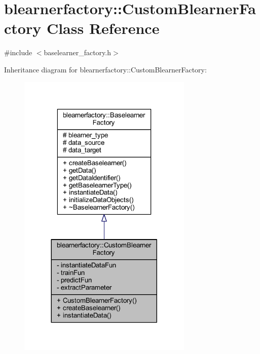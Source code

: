 \hypertarget{classblearnerfactory_1_1_custom_blearner_factory}{}\section{blearnerfactory\+:\+:Custom\+Blearner\+Factory Class Reference}
\label{classblearnerfactory_1_1_custom_blearner_factory}


{\ttfamily \#include $<$baselearner\+\_\+factory.\+h$>$}



Inheritance diagram for blearnerfactory\+:\+:Custom\+Blearner\+Factory\+:\nopagebreak
\begin{figure}[H]
\begin{center}
\leavevmode
\includegraphics[width=236pt]{classblearnerfactory_1_1_custom_blearner_factory__inherit__graph}
\end{center}
\end{figure}



